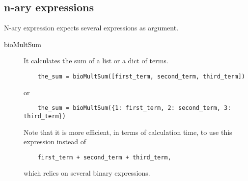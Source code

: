 \documentclass[12pt,a4paper]{article}
\begin{document}
\subsection{n-ary expressions}
N-ary expression expects several expressions as argument.   
\begin{description}
  \item[bioMultSum]  It calculates the sum of a list or a dict of terms.
  \begin{lstlisting}
    the_sum = bioMultSum([first_term, second_term, third_term])
  \end{lstlisting}
  or
  \begin{lstlisting}
    the_sum = bioMultSum({1: first_term, 2: second_term, 3: third_term})
  \end{lstlisting}
  Note that it is more efficient, in terms of calculation time, to use this expression instead 
 of
  \begin{lstlisting}
    first_term + second_term + third_term,
  \end{lstlisting}
  which relies on several binary expressions.
  

\end{description}
\end{document}
